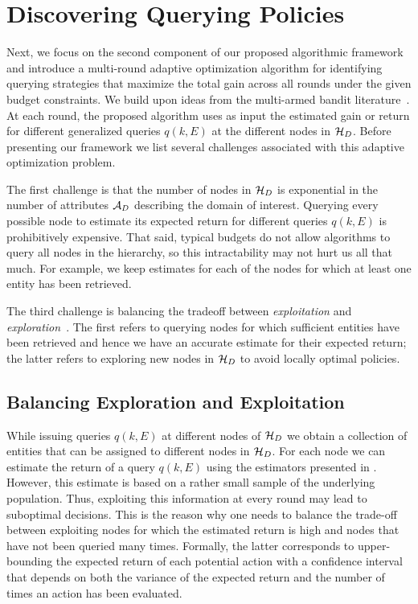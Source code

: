 

\section{Discovering Querying Policies}
\label{sec:solving}
Next, we focus on the second component of our proposed algorithmic framework and introduce a multi-round adaptive optimization algorithm for identifying querying strategies that maximize the total gain across all rounds under the given budget constraints. We build upon ideas from the multi-armed bandit literature~\cite{Auer:2003,EvenDar06actionelimination}. At each round, the proposed algorithm uses as input the estimated gain or return for different generalized queries $q(k,E)$ at the different nodes in $\mathcal{H}_D$. Before presenting our framework we list several challenges associated with this adaptive optimization problem.

\squishlist
\item The first challenge is that the number of nodes in $\mathcal{H}_D$ is exponential in the number of attributes $\mathcal{A}_D$ describing the domain of interest. Querying every possible node to estimate its expected return for different queries $q(k,E)$ is prohibitively expensive. That said, typical budgets do not allow algorithms to query all nodes in the hierarchy, so this intractability may not hurt us all that much. For example, we keep estimates for each of the nodes for which at least one entity has been retrieved.
\item The third challenge is balancing the tradeoff between {\em exploitation} and {\em exploration}~\cite{Auer:2003}. The first refers to querying nodes for which sufficient entities have been retrieved and hence we have an accurate estimate for their expected return; the latter refers to exploring new nodes in $\mathcal{H}_D$ to avoid locally optimal policies.
\squishend

\subsection{Balancing Exploration and Exploitation}
\label{sec:balancing}
While issuing queries $q(k,E)$ at different nodes of $\mathcal{H}_D$ we obtain a collection of entities that can be assigned to different nodes in $\mathcal{H}_D$. For each node we can estimate the return of a query $q(k,E)$ using the estimators presented in . However, this estimate is based on a rather small sample of the underlying population. Thus, exploiting this information at every round may lead to suboptimal decisions. This is the reason why one needs to balance the trade-off between exploiting nodes for which the estimated return is high and nodes that have not been queried many times. Formally, the latter corresponds to upper-bounding the expected return of each potential action with a confidence interval that depends on both the variance of the expected return and the number of times an action has been evaluated.

